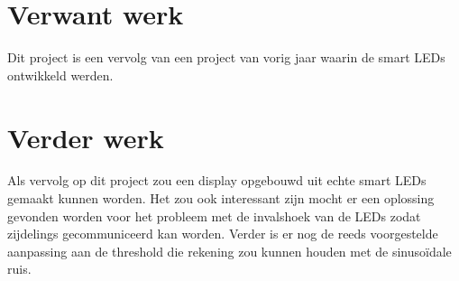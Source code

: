\documentclass{article}
\begin{document}
\section{Verwant werk}
Dit project is een vervolg van een project van vorig jaar waarin de smart LEDs ontwikkeld werden. 


\section{Verder werk}
Als vervolg op dit project zou een display opgebouwd uit echte smart LEDs gemaakt kunnen worden. Het zou ook interessant zijn mocht er een oplossing gevonden worden voor het probleem met de invalshoek van de LEDs zodat zijdelings gecommuniceerd kan worden. Verder is er nog de reeds voorgestelde aanpassing aan de threshold die rekening zou kunnen houden met de sinusoïdale ruis.


%
%
\end{document}
